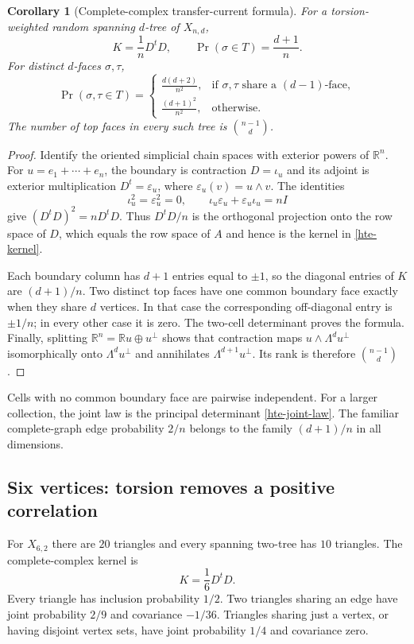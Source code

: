 \documentclass[11pt]{article}
\newtheorem{corollary}[theorem]{Corollary}
\theoremstyle{definition}
\theoremstyle{remark}
\newcommand{\R}{\mathbb R}
\begin{document}
\begin{corollary}[Complete-complex transfer-current formula]
\label{hte-complete-complex}
For a torsion-weighted random spanning $d$-tree of $X_{n,d}$,
\[
K=\frac1nD^tD,
\qquad
\Pr(\sigma\in T)=\frac{d+1}{n}.
\]
For distinct $d$-faces $\sigma,\tau$,
\[
\Pr(\sigma,\tau\in T)=
\begin{cases}
\displaystyle\frac{d(d+2)}{n^2},
 &\text{if $\sigma,\tau$ share a $(d-1)$-face},\\[4pt]
\displaystyle\frac{(d+1)^2}{n^2},
 &\text{otherwise}.
\end{cases}
\]
The number of top faces in every such tree is $\binom{n-1}{d}$.
\end{corollary}

\begin{proof}
Identify the oriented simplicial chain spaces with exterior powers of
$\R^n$. For $u=e_1+\cdots+e_n$, the boundary is contraction
$D=\iota_u$ and its adjoint is exterior multiplication
$D^t=\varepsilon_u$, where $\varepsilon_u(v)=u\wedge v$. The identities
\[
\iota_u^2=\varepsilon_u^2=0,
\qquad
\iota_u\varepsilon_u+\varepsilon_u\iota_u=nI
\]
give $(D^tD)^2=nD^tD$. Thus $D^tD/n$ is the orthogonal projection onto
the row space of $D$, which equals the row space of $A$ and hence is the
kernel in \eqref{hte-kernel}.

Each boundary column has $d+1$ entries equal to $\pm1$, so the diagonal
entries of $K$ are $(d+1)/n$. Two distinct top faces have one common
boundary face exactly when they share $d$ vertices. In that case the
corresponding off-diagonal entry is $\pm1/n$; in every other case it is
zero. The two-cell determinant proves the formula. Finally, splitting
$\R^n=\R u\oplus u^\perp$ shows that contraction maps
$u\wedge\Lambda^d u^\perp$ isomorphically onto
$\Lambda^d u^\perp$ and annihilates $\Lambda^{d+1}u^\perp$.
Its rank is therefore $\binom{n-1}{d}$.
\end{proof}

Cells with no common boundary face are pairwise independent. For a larger
collection, the joint law is the principal determinant \eqref{hte-joint-law}.
The familiar complete-graph edge probability $2/n$ belongs to the family
$(d+1)/n$ in all dimensions.

\subsection{Six vertices: torsion removes a positive correlation}

For $X_{6,2}$ there are $20$ triangles and every spanning two-tree has
$10$ triangles. The complete-complex kernel is
\[
K=\frac16D^tD.
\]
Every triangle has inclusion probability $1/2$. Two triangles sharing an
edge have joint probability $2/9$ and covariance $-1/36$. Triangles
sharing just a vertex, or having disjoint vertex sets, have joint
probability $1/4$ and covariance zero.
\end{document}

